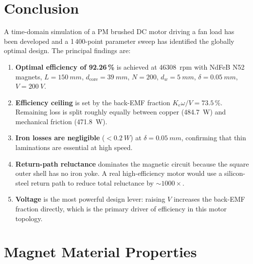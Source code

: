 \documentclass[10pt, twocolumn, a4paper]{article}
\begin{document}
\section{Conclusion}
\label{sec:conclusion}

A time-domain simulation of a PM brushed DC motor driving a fan load has
been developed and a 1\,400-point parameter sweep has identified the
globally optimal design. The principal findings are:

\begin{enumerate}[leftmargin=2em, itemsep=2pt]
  \item \textbf{Optimal efficiency of 92.26\,\%} is achieved at
        \SI{46308}{rpm} with NdFeB N52 magnets, $L = \SI{150}{mm}$,
        $d_\text{core} = \SI{39}{mm}$, $N = 200$, $d_w = \SI{5}{mm}$,
        $\delta = \SI{0.05}{mm}$, $V = \SI{200}{V}$.

  \item \textbf{Efficiency ceiling} is set by the back-EMF fraction
        $K_e\omega/V = 73.5\,\%$. Remaining loss is split roughly equally
        between copper (\SI{484.7}{W}) and mechanical friction
        (\SI{471.8}{W}).

  \item \textbf{Iron losses are negligible} ($<\SI{0.2}{W}$) at
        $\delta = \SI{0.05}{mm}$, confirming that thin laminations are
        essential at high speed.

  \item \textbf{Return-path reluctance} dominates the magnetic circuit
        because the square outer shell has no iron yoke.  A real
        high-efficiency motor would use a silicon-steel return path to
        reduce total reluctance by ${\sim}1000\times$.

  \item \textbf{Voltage} is the most powerful design lever: raising $V$
        increases the back-EMF fraction directly, which is the primary
        driver of efficiency in this motor topology.
\end{enumerate}

\appendix
\section{Magnet Material Properties}
\label{app:materials}
\end{document}
